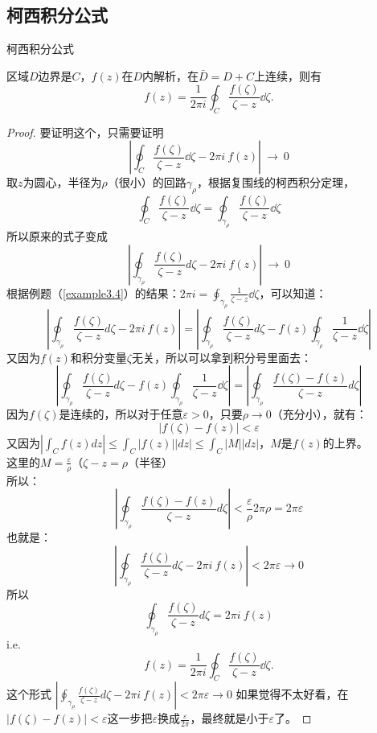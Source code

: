 \documentclass[cn,hazy,blue,14pt,normal]{elegantnote}
\numberwithin{equation}{section}
\begin{document}
\subsection{柯西积分公式}
\begin{definition}
	柯西积分公式
\end{definition}
区域$D$边界是$C$，$f(z)$在$D$内解析，在$\bar{D}=D+C$上连续，则有
\begin{equation}\label{柯西积分公式}
f(z) = \frac{1}{2\pi i} \oint_C \frac{f(\zeta)}{\zeta - z} \dd\zeta.
\end{equation}
\begin{proof}
要证明这个，只需要证明
$$\left|  \oint_C \frac{f(\zeta)}{\zeta - z} \dd\zeta - 2\pi i~f(z) \right|~\to~0$$
取$z$为圆心，半径为$\rho$（很小）的回路$\gamma_\rho$，根据复围线的柯西积分定理，
$$
\oint_C \frac{f(\zeta)}{\zeta - z} \dd \zeta
= \oint_{\gamma_\rho} \frac{f(\zeta)}{\zeta - z} \dd \zeta
$$
所以原来的式子变成
$$\left|\oint_{\gamma_\rho} \frac{f(\zeta)}{\zeta - z} d\zeta - 2\pi i~f(z)  \right|~\to~0$$
根据例题（\ref{example3.4}）的结果：$2\pi i = \oint_{\gamma_\rho}\frac{1}{\zeta - z} \dd \zeta$，可以知道：
$$
\left|\oint_{\gamma_\rho} \frac{f(\zeta)}{\zeta - z} d\zeta - 2\pi i~f(z)  \right| 
= \left|\oint_{\gamma_\rho} \frac{f(\zeta)}{\zeta - z} d\zeta - f(z)\oint_{\gamma_\rho}\frac{1}{\zeta - z} \dd \zeta  \right|
$$
又因为$f(z)$和积分变量$\zeta$无关，所以可以拿到积分号里面去：
$$
\left|\oint_{\gamma_\rho} \frac{f(\zeta)}{\zeta - z} d\zeta - f(z)\oint_{\gamma_\rho}\frac{1}{\zeta - z} \dd \zeta  \right|
= \left|\oint_{\gamma_\rho} \frac{f(\zeta) - f(z)}{\zeta - z} d\zeta \right| 
$$
因为$f(\zeta)$是连续的，所以对于任意$\varepsilon>0$，只要$\rho \to 0$（充分小），就有：
$$ \left | f(\zeta)-f(z) \right | < \varepsilon $$
又因为$|\int_C f(z) dz | \leqslant \int_C |f(z)| |dz| \leqslant \int_C |M| |dz|$，$M$是$f(z)$的上界。\\
这里的$M = \frac \varepsilon \rho$（$\zeta - z = \rho$（半径）\\
所以：
$$ \left|\oint_{\gamma_\rho} \frac{f(\zeta) - f(z)}{\zeta - z} d\zeta \right| < \frac \varepsilon \rho 2\pi \rho = 2 \pi \varepsilon $$
也就是：
$$ \left|\oint_{\gamma_\rho} \frac{f(\zeta)}{\zeta - z} d\zeta - 2\pi i~f(z)  \right| < 2\pi\varepsilon \to 0$$
所以
$$\oint_{\gamma_\rho} \frac{f(\zeta)}{\zeta - z} d\zeta = 2\pi i~f(z)$$
i.e.
$$ f(z) = \frac{1}{2\pi i} \oint_C \frac{f(\zeta)}{\zeta - z} \dd\zeta.$$
这个形式
$ \left|\oint_{\gamma_\rho} \frac{f(\zeta)}{\zeta - z} d\zeta - 2\pi i~f(z)  \right| < 2\pi\varepsilon \to 0$
如果觉得不太好看，在$ \left | f(\zeta)-f(z) \right | < \varepsilon $这一步把$\varepsilon$换成$\frac{\varepsilon}{2\pi}$，最终就是小于$\varepsilon$了。

\end{proof}
\end{document}

